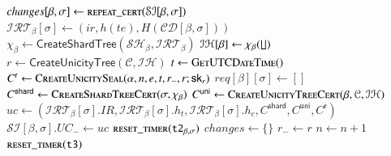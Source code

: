 \begin{algorithm}
  \caption{Unicity Certificate Generation}\label{alg:uc-gen}
  \begin{algorithmic}[0]
      
         
            \State $changes[\beta,\sigma] \gets \Call{repeat\_cert}{\mathcal{SI}[\beta, \sigma]}$    
          \EndIf
        \EndFor
      \EndFor
         
         \State $\mathcal{IRT}_\beta[\sigma] \gets (ir, h(te), H(\mathcal{CD}[\beta,\sigma]))$
      \EndFor
        \State $\chi_\beta\gets\mathsf{CreateShardTree}(\mathcal{SH}_\beta,\mathcal{IRT}_\beta)$        
        \State $\mathcal{IH}[\beta]\gets \chi_\beta(\lfloor\!\rfloor)$
      \EndFor
      \State $r \gets \mathsf{CreateUnicityTree}(\mathcal{C}, \mathcal{IH})$ 
      \State $t \gets \Call{GetUTCDateTime}$
      \State $C^\mathsf{r} \gets \Call{CreateUnicitySeal}{\alpha, n, e, t, r_-, r; \mathsf{sk}_r}$
        \State $req[\beta][\sigma] \gets []$
        \State $C^\mathsf{shard} \gets \Call{CreateShardTreeCert}{\sigma, \chi_\beta}$
        \State $C^\mathsf{uni} \gets \Call{CreateUnicityTreeCert}{\beta, \mathcal{C}, \mathcal{IH}}$
        \State $uc \gets (\mathcal{IRT}_\beta[\sigma].IR, \mathcal{IRT}_\beta[\sigma].h_t,\mathcal{IRT}_\beta[\sigma].h_c, C^\mathsf{shard}, C^\mathsf{uni}, C^\mathsf{r})$
        \State $\mathcal{SI}[\beta, \sigma].UC_- \gets uc$
         
          \State {} 
        \EndFor
        \State $\Call{reset\_timer}{\texttt{t2}_{\beta, \sigma}}$
      \EndFor
      \State $changes \gets \{\}$
      \State $r_- \gets r$
      \State $n \gets n+1$
      \State $\Call{reset\_timer}{\texttt{t3}}$
      \State {}
    \EndEvent
  \end{algorithmic}
\end{algorithm}


